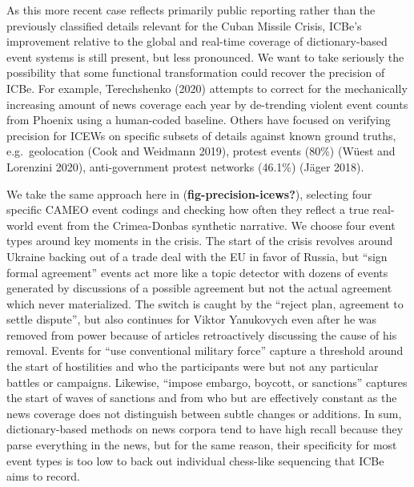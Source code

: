 \documentclass{article}
\begin{document}
As this more recent case reflects primarily public reporting rather than
the previously classified details relevant for the Cuban Missile Crisis,
ICBe's improvement relative to the global and real-time coverage of
dictionary-based event systems is still present, but less pronounced. We
want to take seriously the possibility that some functional
transformation could recover the precision of ICBe. For example,
Terechshenko (2020) attempts to correct for the mechanically increasing
amount of news coverage each year by de-trending violent event counts
from Phoenix using a human-coded baseline. Others have focused on
verifying precision for ICEWs on specific subsets of details against
known ground truths, e.g.~geolocation (Cook and Weidmann 2019), protest
events (80\%) (Wüest and Lorenzini 2020), anti-government protest
networks (46.1\%) (Jäger 2018).

We take the same approach here in (\textbf{fig-precision-icews?}),
selecting four specific CAMEO event codings and checking how often they
reflect a true real-world event from the Crimea-Donbas synthetic
narrative. We choose four event types around key moments in the crisis.
The start of the crisis revolves around Ukraine backing out of a trade
deal with the EU in favor of Russia, but ``sign formal agreement''
events act more like a topic detector with dozens of events generated by
discussions of a possible agreement but not the actual agreement which
never materialized. The switch is caught by the ``reject plan, agreement
to settle dispute'', but also continues for Viktor Yanukovych even after
he was removed from power because of articles retroactively discussing
the cause of his removal. Events for ``use conventional military force''
capture a threshold around the start of hostilities and who the
participants were but not any particular battles or campaigns. Likewise,
``impose embargo, boycott, or sanctions'' captures the start of waves of
sanctions and from who but are effectively constant as the news coverage
does not distinguish between subtle changes or additions. In sum,
dictionary-based methods on news corpora tend to have high recall
because they parse everything in the news, but for the same reason,
their specificity for most event types is too low to back out individual
chess-like sequencing that ICBe aims to record.
\end{document}
